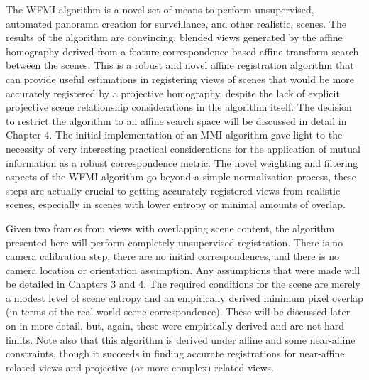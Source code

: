 %
%
%
%
%
%

%
%
%



The WFMI algorithm is a novel set of means to perform unsupervised, automated panorama creation for surveillance, and other realistic, scenes. The results of the algorithm are convincing, blended views generated by the affine homography derived from a feature correspondence based affine transform search between the scenes. This is a robust and novel affine registration algorithm that can provide useful estimations in registering views of scenes that would be more accurately registered by a projective homography, despite the lack of explicit projective scene relationship considerations in the algorithm itself. The decision to restrict the algorithm to an affine search space will be discussed in detail in Chapter 4. The initial implementation of an MMI algorithm gave light to the necessity of very interesting practical considerations for the application of mutual information as a robust correspondence metric. The novel weighting and filtering aspects of the WFMI algorithm go beyond a simple normalization process, these steps are actually crucial to getting accurately registered views from realistic scenes, especially in scenes with lower entropy or minimal amounts of overlap.

Given two frames from views with overlapping scene content, the algorithm presented here will perform completely unsupervised registration. There is no camera calibration step, there are no initial correspondences, and there is no camera location or orientation assumption. Any assumptions that were made will be detailed in Chapters 3 and 4. The required conditions for the scene are merely a modest level of scene entropy and an empirically derived minimum pixel overlap (in terms of the real-world scene correspondence). These will be discussed later on in more detail, but, again, these were empirically derived and are not hard limits. Note also that this algorithm is derived under affine and some near-affine constraints, though it succeeds in finding accurate registrations for near-affine related views and projective (or more complex) related views.

